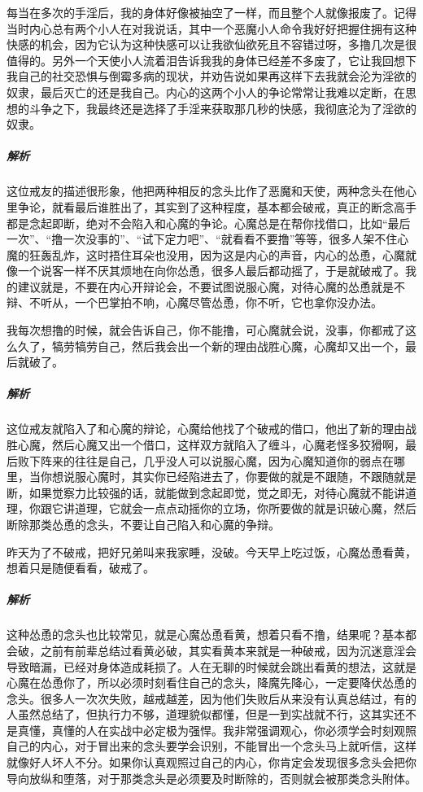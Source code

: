 \begin{case}[心魔会帮你找借口]
    每当在多次的手淫后，我的身体好像被抽空了一样，而且整个人就像报废了。记得当时内心总有两个小人在对我说话，其中一个恶魔小人命令我好好把握住拥有这种快感的机会，因为它认为这种快感可以让我欲仙欲死且不容错过呀，多撸几次是很值得的。另外一个天使小人流着泪告诉我我的身体已经差不多废了，它让我回想下我自己的社交恐惧与倒霉多病的现状，并劝告说如果再这样下去我就会沦为淫欲的奴隶，最后灭亡的还是我自己。内心的这两个小人的争论常常让我难以定断，在思想的斗争之下，我最终还是选择了手淫来获取那几秒的快感，我彻底沦为了淫欲的奴隶。
    \subparagraph{解析} 这位戒友的描述很形象，他把两种相反的念头比作了恶魔和天使，两种念头在他心里争论，就看最后谁胜出了，其实到了这种程度，基本都会破戒，真正的断念高手都是念起即断，绝对不会陷入和心魔的争论。心魔总是在帮你找借口，比如“最后一次”、“撸一次没事的”、“试下定力吧”、“就看看不要撸”等等，很多人架不住心魔的狂轰乱炸，这时捂住耳朵也没用，因为这是内心的声音，内心的怂恿，心魔就像一个说客一样不厌其烦地在向你怂恿，很多人最后都动摇了，于是就破戒了。我的建议就是，不要在内心开辩论会，不要试图说服心魔，对待心魔的怂恿就是不辩、不听从，一个巴掌拍不响，心魔尽管怂恿，你不听，它也拿你没办法。
\end{case}

\begin{case}[心魔会帮你找借口]
    我每次想撸的时候，就会告诉自己，你不能撸，可心魔就会说，没事，你都戒了这么久了，犒劳犒劳自己，然后我会出一个新的理由战胜心魔，心魔却又出一个，最后就破了。
    \subparagraph{解析} 这位戒友就陷入了和心魔的辩论，心魔给他找了个破戒的借口，他出了新的理由战胜心魔，然后心魔又出一个借口，这样双方就陷入了缠斗，心魔老怪多狡猾啊，最后败下阵来的往往是自己，几乎没人可以说服心魔，因为心魔知道你的弱点在哪里，当你想说服心魔时，其实你已经陷进去了，你要做的就是不跟随，不跟随就是断，如果觉察力比较强的话，就能做到念起即觉，觉之即无，对待心魔就不能讲道理，你跟它讲道理，它就会一点点动摇你的立场，你所要做的就是识破心魔，然后断除那类怂恿的念头，不要让自己陷入和心魔的争辩。
\end{case}

\begin{case}[心魔会帮你找借口]
    昨天为了不破戒，把好兄弟叫来我家睡，没破。今天早上吃过饭，心魔怂恿看黄，想着只是随便看看，破戒了。
    \subparagraph{解析} 这种怂恿的念头也比较常见，就是心魔怂恿看黄，想着只看不撸，结果呢？基本都会破，之前有前辈总结过看黄必破，其实看黄本来就是一种破戒，因为沉迷意淫会导致暗漏，已经对身体造成耗损了。人在无聊的时候就会跳出看黄的想法，这就是心魔在怂恿你了，所以必须时刻看住自己的念头，降魔先降心，一定要降伏怂恿的念头。很多人一次次失败，越戒越差，因为他们失败后从来没有认真总结过，有的人虽然总结了，但执行力不够，道理貌似都懂，但是一到实战就不行，这其实还不是真懂，真懂的人在实战中必定极为强悍。我非常强调观心，你必须学会时刻观照自己的内心，对于冒出来的念头要学会识别，不能冒出一个念头马上就听信，这样就像好人坏人不分。如果你认真观照过自己的内心，你肯定会发现很多念头会把你导向放纵和堕落，对于那类念头是必须要及时断除的，否则就会被那类念头附体。
\end{case}

